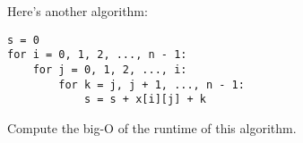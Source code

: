 Here's another algorithm:
\begin{Verbatim}[frame=single, fontsize=\small]
s = 0
for i = 0, 1, 2, ..., n - 1:
    for j = 0, 1, 2, ..., i:
        for k = j, j + 1, ..., n - 1:
            s = s + x[i][j] + k
\end{Verbatim}
Compute the big-O of the runtime of this algorithm.

